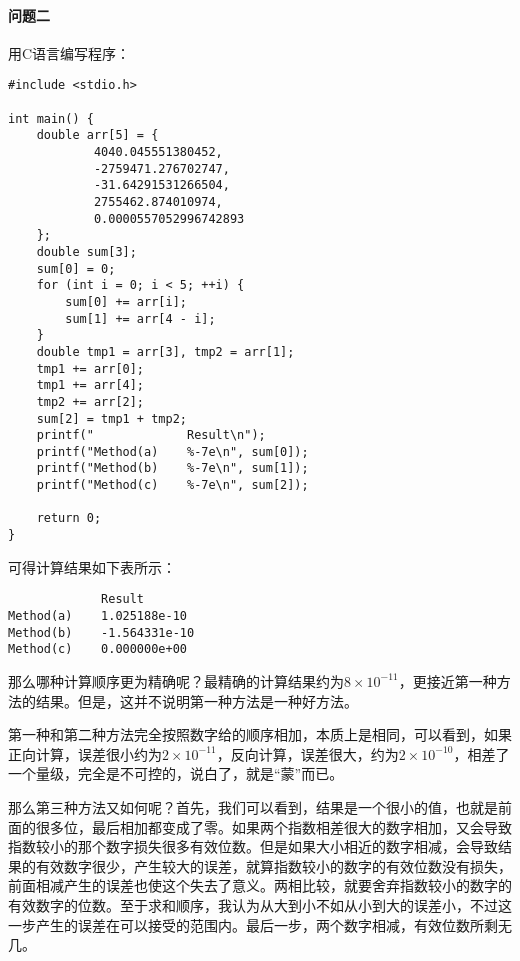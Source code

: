\documentclass[UTF8,zihao=-4]{ctexart}
\begin{document}
	\paragraph{问题二}用C语言编写程序：
	\begin{lstlisting}
#include <stdio.h>

int main() {
    double arr[5] = {
            4040.045551380452,
            -2759471.276702747,
            -31.64291531266504,
            2755462.874010974,
            0.0000557052996742893
    };
    double sum[3];
    sum[0] = 0;
    for (int i = 0; i < 5; ++i) {
        sum[0] += arr[i];
        sum[1] += arr[4 - i];
    }
    double tmp1 = arr[3], tmp2 = arr[1];
    tmp1 += arr[0];
    tmp1 += arr[4];
    tmp2 += arr[2];
    sum[2] = tmp1 + tmp2;
    printf("             Result\n");
    printf("Method(a)    %-7e\n", sum[0]);
    printf("Method(b)    %-7e\n", sum[1]);
    printf("Method(c)    %-7e\n", sum[2]);

    return 0;
}
	\end{lstlisting}
	可得计算结果如下表所示：
	\begin{lstlisting}
             Result
Method(a)    1.025188e-10
Method(b)    -1.564331e-10
Method(c)    0.000000e+00
	\end{lstlisting}
	那么哪种计算顺序更为精确呢？最精确的计算结果约为$8\times 10^{-11}$，更接近第一种方法的结果。但是，这并不说明第一种方法是一种好方法。
	
	第一种和第二种方法完全按照数字给的顺序相加，本质上是相同，可以看到，如果正向计算，误差很小约为$2\times 10^{-11}$，反向计算，误差很大，约为$2\times 10^{-10}$，相差了一个量级，完全是不可控的，说白了，就是``蒙''而已。
	
	那么第三种方法又如何呢？首先，我们可以看到，结果是一个很小的值，也就是前面的很多位，最后相加都变成了零。如果两个指数相差很大的数字相加，又会导致指数较小的那个数字损失很多有效位数。但是如果大小相近的数字相减，会导致结果的有效数字很少，产生较大的误差，就算指数较小的数字的有效位数没有损失，前面相减产生的误差也使这个失去了意义。两相比较，就要舍弃指数较小的数字的有效数字的位数。至于求和顺序，我认为从大到小不如从小到大的误差小，不过这一步产生的误差在可以接受的范围内。最后一步，两个数字相减，有效位数所剩无几。
\end{document}

